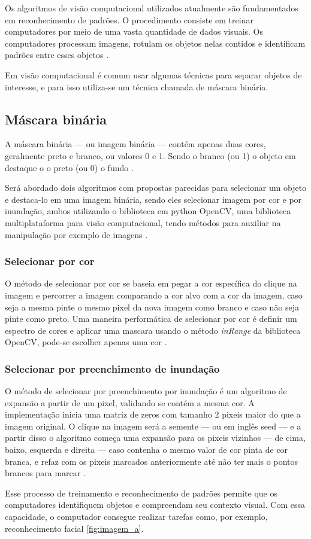 Os algoritmos de visão computacional utilizados atualmente são fundamentados em reconhecimento de padrões. O procedimento consiste em treinar computadores por meio de uma vasta quantidade de dados visuais. Os computadores processam imagens, rotulam os objetos nelas contidos e identificam padrões entre esses objetos \space\cite{content_Human_Vision}.

Em visão computacional é comum usar algumas técnicas para separar objetos de interesse, e para isso utiliza-se um técnica chamada de máscara binária.

\subsection{Máscara binária}
\label{subsec:mascara_binaria}

A máscara binária — ou imagem binária — contém apenas duas cores, geralmente preto e branco, ou valores 0 e 1. Sendo o branco (ou 1) o objeto em destaque o o preto (ou 0) o fundo \cite{Embarcados}.

Será abordado dois algoritmos com propostas parecidas para selecionar um objeto e destaca-lo em uma imagem binária, sendo eles selecionar imagem por cor e por inundação, ambos utilizando o biblioteca em python OpenCV, uma biblioteca multiplataforma para visão computacional, tendo métodos para auxiliar na manipulação por exemplo de imagens \cite{OpenCV}.

\subsubsection*{Selecionar por cor}
\label{subsubsec:sel_cor}

O método de selecionar por cor se baseia em pegar a cor específica do clique na imagem e percorrer a imagem comparando a cor alvo com a cor da imagem, caso seja a mesma pinte o mesmo pixel da nova imagem como branco e caso não seja pinte como preto. Uma maneira performática de selecionar por cor é definir um espectro de cores e aplicar uma mascara usando o método \textit{inRange} da biblioteca OpenCV, pode-se escolher apenas uma cor \cite{OpenCVInRange}.

\subsubsection*{Selecionar por preenchimento de inundação}
\label{subsubsec:sel_floodFill}

O método de  selecionar por preenchimento por inundação é um algoritmo de expansão a partir de um pixel, validando se contém a mesma cor. A implementação inicia uma matriz de zeros com tamanho 2 pixeis maior do que a imagem original. O clique na  imagem será a semente — ou em inglês  seed — e a partir disso o algoritmo começa uma expansão para os pixeis vizinhos — de cima, baixo, esquerda e direita — caso contenha o mesmo valor de cor pinta de cor branca, e refaz com os pixeis marcados  anteriormente até não ter mais o pontos brancos para marcar \cite{OpenCVFloodFill}.

Esse processo de treinamento e reconhecimento de padrões permite que os computadores identifiquem objetos e compreendam seu contexto visual. Com essa capacidade, o computador consegue realizar tarefas como, por exemplo, reconhecimento facial \cref{fig:imagem_a}.



